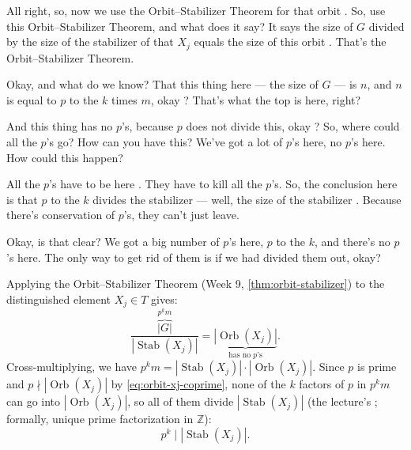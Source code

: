 \begin{proofWrapper}
\begin{speech}[00:14:00 - 00:15:50]
All right, so, now we use the Orbit--Stabilizer Theorem for that orbit . So, use this Orbit--Stabilizer Theorem, and what does it say? It says the size of $G$ divided by the size of the stabilizer of that $X_j$ equals the size of this orbit . That's the Orbit--Stabilizer Theorem.

Okay, and what do we know? That this thing here --- the size of $G$ --- is $n$, and $n$ is equal to $p$ to the $k$ times $m$, okay ? That's what the top is here, right?

And this thing has no $p$'s, because $p$ does not divide this, okay ? So, where could all the $p$'s go? How can you have this? We've got a lot of $p$'s here, no $p$'s here. How could this happen?

All the $p$'s have to be here . They have to kill all the $p$'s. So, the conclusion here is that $p$ to the $k$ divides the stabilizer --- well, the size of the stabilizer . Because there's conservation of $p$'s, they can't just leave.

Okay, is that clear? We got a big number of $p$'s here, $p$ to the $k$, and there's no $p$'s here. The only way to get rid of them is if we had divided them out, okay?
\end{speech}

\begin{content}
Applying the Orbit--Stabilizer Theorem (Week 9, \cref{thm:orbit-stabilizer}) to the distinguished element $X_j \in T$ gives:
\[
\frac{\overbrace{|G|}^{p^k m}}{|\operatorname{Stab}(X_j)|} = \underbrace{|\operatorname{Orb}(X_j)|}_{\text{has no } p\text{'s}}.
\]
Cross-multiplying, we have $p^k m = |\operatorname{Stab}(X_j)| \cdot |\operatorname{Orb}(X_j)|$. Since $p$ is prime and $p \nmid |\operatorname{Orb}(X_j)|$ by \eqref{eq:orbit-xj-coprime}, none of the $k$ factors of $p$ in $p^k m$ can go into $|\operatorname{Orb}(X_j)|$, so all of them divide $|\operatorname{Stab}(X_j)|$ (the lecture's ; formally, unique prime factorization in $\mathbb{Z}$):
\begin{equation}\label{eq:pk-divides-stab}
p^k \mid |\operatorname{Stab}(X_j)|.
\end{equation}
\end{content}


\end{proofWrapper}
